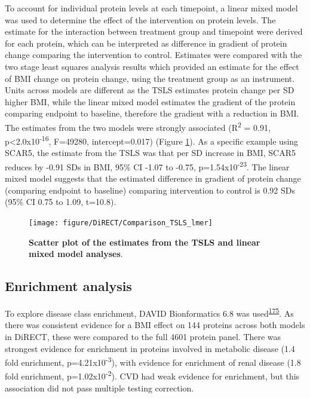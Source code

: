 \documentclass[11pt,twoside]{bristolthesis}
\begin{document}
To account for individual protein levels at each timepoint, a linear mixed model was used to determine the effect of the intervention on protein levels. The estimate for the interaction between treatment group and timepoint were derived for each protein, which can be interpreted as difference in gradient of protein change comparing the intervention to control. Estimates were compared with the two stage least squares analysis results which provided an estimate for the effect of BMI change on protein change, using the treatment group as an instrument. Units across models are different as the TSLS estimates protein change per SD higher BMI, while the linear mixed model estimates the gradient of the protein comparing endpoint to baseline, therefore the gradient with a reduction in BMI. The estimates from the two models were strongly associated (R\textsuperscript{2} = 0.91, p\textless2.0x10\textsuperscript{-16}, F=49280, intercept=0.017) (Figure \ref{fig:tsls-lmer}). As a specific example using SCAR5, the estimate from the TSLS was that per SD increase in BMI, SCAR5 reduces by -0.91 SDs in BMI, 95\% CI -1.07 to -0.75, p=1.54x10\textsuperscript{-23}. The linear mixed model suggests that the estimated difference in gradient of protein change (comparing endpoint to baseline) comparing intervention to control is 0.92 SDs (95\% CI 0.75 to 1.09, t=10.8).



\begin{figure}

{\centering \texttt{[image: figure/DiRECT/Comparison\_TSLS\_lmer]} 

}

\caption[Scatter plot of the estimates from the TSLS and linear mixed model analyses]{\textbf{Scatter plot of the estimates from the TSLS and linear mixed model analyses}.}\label{fig:tsls-lmer}
\end{figure}
\hypertarget{enrichment-analysis-1}{%
\subsection{Enrichment analysis}\label{enrichment-analysis-1}}

To explore disease class enrichment, DAVID Bionformatics 6.8 was used\textsuperscript{\protect\hyperlink{ref-Huang2009}{175}}. As there was consistent evidence for a BMI effect on 144 proteins across both models in DiRECT, these were compared to the full 4601 protein panel. There was strongest evidence for enrichment in proteins involved in metabolic disease (1.4 fold enrichment, p=4.21x10\textsuperscript{-3}), with evidence for enrichment of renal disease (1.8 fold enrichment, p=1.02x10\textsuperscript{-2}). CVD had weak evidence for enrichment, but this association did not pass multiple testing correction.
\end{document}
